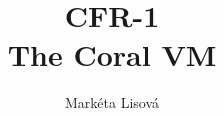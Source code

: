 \documentclass[12pt,a4paper,twoside,titlepage]{book}
\begin{document}
\frontmatter
\title{CFR-1\\ \large The Coral VM}
\renewcommand{\docversion}{0.1}
\author{Markéta Lisová}
\maketitle
\clearemptydoublepage
\tableofcontents

\mainmatter
\sloppy



\appendix
\end{document}
